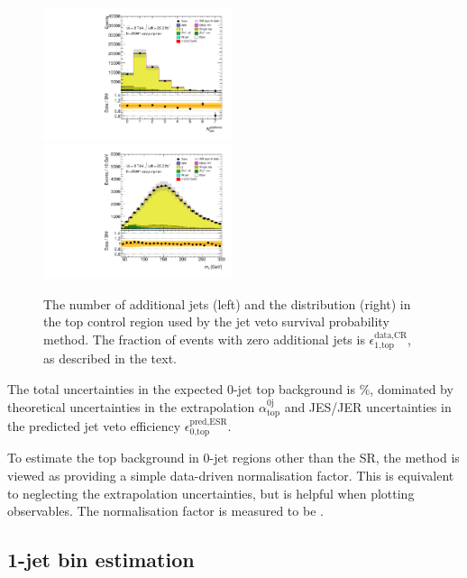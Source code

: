 \begin{figure}[t]
	\includegraphics[width=0.495\textwidth]{tex/backgrounds/emme_CutTopControl_AddTrackMET_nJets_probing_mh125_lin}
	\hfill
	\includegraphics[width=0.495\textwidth]{tex/backgrounds/emme_CutTopControl_AddTrackMET_MT_TrackHWW_Clj_mh125_lin}
	\caption{The number of additional jets (left) and the \mt distribution (right) in the 
	top control region used by the jet veto survival probability method. The fraction of 
	events with zero additional jets is $\epsilon_{\text{1,top}}^{\text{data,CR}}$, as 
	described in the text.}
	\label{fig:top:jvsp}
\end{figure}

The total uncertainties in the expected 0-jet top background is \%, dominated by 
theoretical uncertainties in the extrapolation $\alpha_{\text{top}}^{\text{0j}}$ and 
JES/JER uncertainties in the predicted jet veto efficiency 
$\epsilon_{\text{0,top}}^{\text{pred,ESR}}$.

To estimate the top background in 0-jet regions other than the SR, the method is viewed as 
providing a simple data-driven normalisation factor. This is equivalent to neglecting the 
extrapolation uncertainties, but is helpful when plotting observables. The normalisation 
factor is measured to be .



\subsection{1-jet bin estimation}
\label{sec:top:1j}

